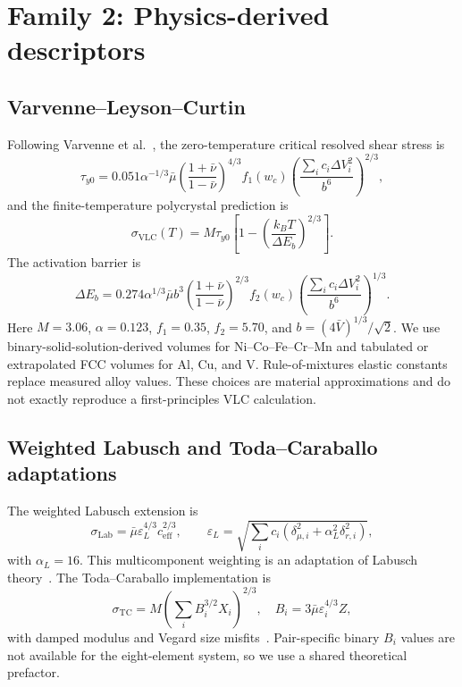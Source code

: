 \documentclass[a4paper,11pt]{article}
\newcommand{\familytwo}{Physics-derived descriptors}
\begin{document}
\section{Family 2: \familytwo}
\label{si:sss}

\subsection{Varvenne--Leyson--Curtin}

Following Varvenne et al.~\cite{Varvenne2016,Varvenne2017}, the zero-temperature critical resolved shear stress is
\begin{equation}
\tau_{y0}=0.051\alpha^{-1/3}\bar\mu
\left(\frac{1+\bar\nu}{1-\bar\nu}\right)^{4/3}f_1(w_c)
\left(\frac{\sum_i c_i\Delta V_i^2}{b^6}\right)^{2/3},
\end{equation}
and the finite-temperature polycrystal prediction is
\begin{equation}
\sigma_{\mathrm{VLC}}(T)=M\tau_{y0}
\left[1-\left(\frac{k_BT}{\Delta E_b}\right)^{2/3}\right].
\end{equation}
The activation barrier is
\begin{equation}
\Delta E_b=0.274\alpha^{1/3}\bar\mu b^3
\left(\frac{1+\bar\nu}{1-\bar\nu}\right)^{2/3}f_2(w_c)
\left(\frac{\sum_i c_i\Delta V_i^2}{b^6}\right)^{1/3}.
\end{equation}
Here $M=3.06$, $\alpha=0.123$, $f_1=0.35$, $f_2=5.70$, and $b=(4\bar V)^{1/3}/\sqrt{2}$. We use binary-solid-solution-derived volumes for Ni--Co--Fe--Cr--Mn and tabulated or extrapolated FCC volumes for Al, Cu, and V. Rule-of-mixtures elastic constants replace measured alloy values. These choices are material approximations and do not exactly reproduce a first-principles VLC calculation.

\subsection{Weighted Labusch and Toda--Caraballo adaptations}

The weighted Labusch extension is
\begin{equation}
\sigma_{\mathrm{Lab}}=\bar\mu\varepsilon_L^{4/3}c_{\mathrm{eff}}^{2/3},\qquad
\varepsilon_L=\sqrt{\sum_i c_i(\delta_{\mu,i}^2+\alpha_L^2\delta_{r,i}^2)},
\end{equation}
with $\alpha_L=16$. This multicomponent weighting is an adaptation of Labusch theory~\cite{Labusch1970}. The Toda--Caraballo implementation is
\begin{equation}
\sigma_{\mathrm{TC}}=M\left(\sum_iB_i^{3/2}X_i\right)^{2/3},\quad
B_i=3\bar\mu\varepsilon_i^{4/3}Z,
\end{equation}
with damped modulus and Vegard size misfits~\cite{TodaCaraballo2015}. Pair-specific binary $B_i$ values are not available for the eight-element system, so we use a shared theoretical prefactor.
\end{document}
